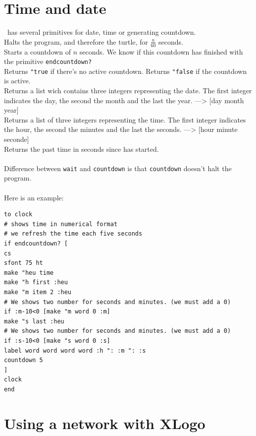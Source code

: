 \section{Time and date}
\xlogo\ has several primitives for date, time or generating countdown.\\
 Halts the program, and therefore the turtle, for $\frac{n}{60}$ seconds.  \\
Starts a countdown of $n$ seconds. We know if this countdown has finished with the primitive \texttt{endcountdown?}\\
Returns \texttt{"true} if there's no active countdown. Returns \texttt{"false} if the countdown is active.\\
Returns a list wich contains three integers representing the date. The first integer indicates the day, the second the month and the last the year. ---> [day month year]\\
Returns a list of three integers representing the time. The first integer indicates the hour, the second the minutes and the last the seconds. ---> [hour minute seconde]\\
 Returns the past time in seconds since \xlogo has started.\\ \\
Difference between \texttt{wait} and \texttt{countdown} is that \texttt{countdown} doesn't halt the program.\\ \\
Here is an example:
\begin{verbatim}
to clock
# shows time in numerical format
# we refresh the time each five seconds
if endcountdown? [
cs 
sfont 75 ht
make "heu time
make "h first :heu
make "m item 2 :heu
# We shows two number for seconds and minutes. (we must add a 0)
if :m-10<0 [make "m word 0 :m]
make "s last :heu
# We shows two number for seconds and minutes. (we must add a 0)
if :s-10<0 [make "s word 0 :s]
label word word word word :h ": :m ": :s 
countdown 5
]
clock
end
\end{verbatim} 

\section{Using a network with XLogo}
\label{network}
